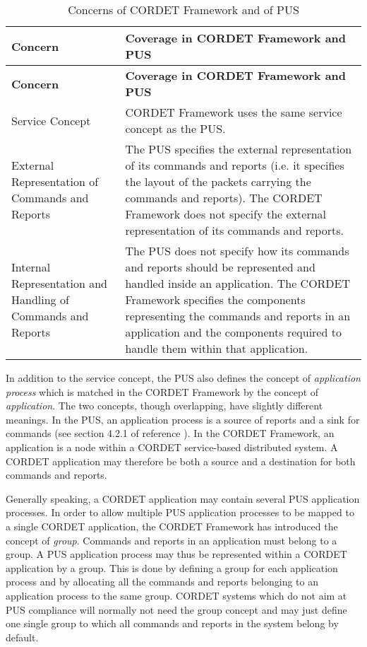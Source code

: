 \begin{longtable}{|>{\raggedright\arraybackslash}p{3cm}|p{8cm}|}
\caption{Concerns of CORDET Framework and of PUS}\label{tab:PusCrConcerns} \\
\hline
\rowcolor{light-gray}
\textbf{Concern} & \textbf{Coverage in CORDET Framework and PUS}\\
\hline\hline
\endfirsthead
\rowcolor{light-gray}
\textbf{Concern} & \textbf{Coverage in CORDET Framework and PUS}\\
\hline\hline
\endhead
Service Concept & CORDET Framework uses the same service concept as the PUS.\\
\hline
External Representation of Commands and Reports & The PUS specifies the external representation of its commands and reports (i.e. it specifies the layout of the packets carrying the commands and reports). The CORDET Framework does not specify the external representation of its commands and reports.\\
\hline
Internal Representation and Handling of Commands and Reports & The PUS does not specify how its commands and reports should be represented and handled inside an application. The CORDET Framework specifies the components representing the commands and reports in an application and the components required to handle them within that application.\\
\hline
\end{longtable}

In addition to the service concept, the PUS also defines the concept of \textit{application process} which is matched in the CORDET Framework by the concept of \textit{application}. The two concepts, though overlapping, have slightly different meanings. In the PUS, an application process is a source of reports and a sink for commands (see section 4.2.1 of reference \cite{ref:pus}). In the CORDET Framework, an application is a node within a CORDET service-based distributed system. A CORDET application may therefore be both a source and a destination for both commands and reports. 

Generally speaking, a CORDET application may contain several PUS application processes. In order to allow multiple PUS application processes to be mapped to a single CORDET application, the CORDET Framework has introduced the concept of \textit{group}. Commands and reports in an application must belong to a group. A PUS application process may thus be represented within a CORDET application by a group. This is done by defining a group for each application process and by allocating all the commands and reports belonging to an application process to the same group. CORDET systems which do not aim at PUS compliance will normally not need the group concept and may just define one single group to which all commands and reports in the system belong by default.